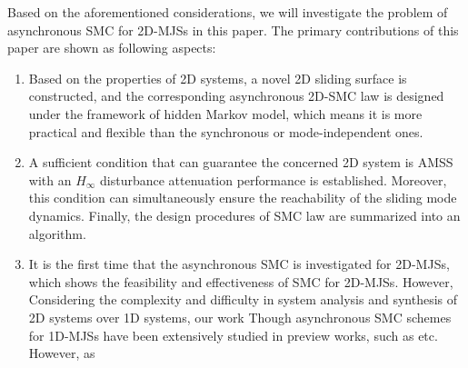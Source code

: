 \documentclass[journal,final,twocolumn]{IEEEtran}
\begin{document}
	Based on the aforementioned considerations, we will investigate the problem of asynchronous SMC for 2D-MJSs in this paper. 
	The primary contributions of this paper are shown as following aspects:
	\begin{enumerate}
		\item Based on the properties of 2D systems, a novel 2D sliding surface is constructed, and the corresponding asynchronous 2D-SMC law is designed under the framework of hidden Markov model, which means it is more practical and flexible than the synchronous or mode-independent ones.
		\item  A sufficient condition that can guarantee the concerned 2D system is AMSS with an  $H_{\infty}$ disturbance attenuation performance is established. Moreover, this condition can simultaneously ensure the reachability of the sliding mode dynamics. Finally, the  design procedures of SMC law are summarized into an algorithm. 
		\item It is the first time that the asynchronous SMC is investigated for 2D-MJSs, which shows the feasibility and effectiveness of SMC for 2D-MJSs.  However, Considering the complexity and difficulty in system analysis and synthesis of 2D systems over 1D systems, our work Though asynchronous SMC schemes for 1D-MJSs have been extensively studied in preview works, such as \cite{song2018asynchronous,li2017passivity,qi2018observer} etc. However, as 
		
	\end{enumerate}
\end{document}
